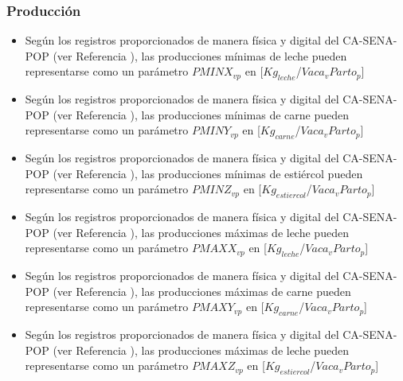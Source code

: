 \subsubsection{Producción}

\begin{itemize}
    \item Según los registros proporcionados de manera física y digital del CA-SENA-POP (ver Referencia \cite{casena}), las producciones mínimas de leche pueden representarse como un parámetro $PMINX_{vp}$ en [$Kg_{leche}$/$Vaca_{v}Parto_{p}$]
    \item Según los registros proporcionados de manera física y digital del CA-SENA-POP (ver Referencia \cite{casena}), las producciones mínimas de carne pueden representarse como un parámetro $PMINY_{vp}$ en [$Kg_{carne}$/$Vaca_{v}Parto_{p}$]
    \item Según los registros proporcionados de manera física y digital del CA-SENA-POP (ver Referencia \cite{casena}), las producciones mínimas de estiércol pueden representarse como un parámetro $PMINZ_{vp}$ en [$Kg_{estiercol}$/$Vaca_{v}Parto_{p}$]
    \item Según los registros proporcionados de manera física y digital del CA-SENA-POP (ver Referencia \cite{casena}), las producciones máximas de leche pueden representarse como un parámetro $PMAXX_{vp}$ en [$Kg_{leche}$/$Vaca_{v}Parto_{p}$]
     \item Según los registros proporcionados de manera física y digital del CA-SENA-POP (ver Referencia \cite{casena}), las producciones máximas de carne pueden representarse como un parámetro $PMAXY_{vp}$ en [$Kg_{carne}$/$Vaca_{v}Parto_{p}$]
      \item Según los registros proporcionados de manera física y digital del CA-SENA-POP (ver Referencia \cite{casena}), las producciones máximas de leche pueden representarse como un parámetro $PMAXZ_{vp}$ en [$Kg_{estiercol}$/$Vaca_{v}Parto_{p}$]
\end{itemize}

